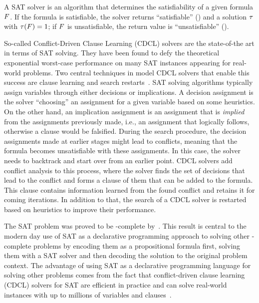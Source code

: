 A SAT solver is an algorithm that determines the satisfiability of a given formula $F$.
If the formula is satisfiable, the solver returns ``satisfiable'' (\sat{}) and a solution $\tau$ with $\tau(F)=1$;
if $F$ is unsatisfiable, the return value is ``unsatisfiable'' (\unsat{}).

So-called Conflict-Driven Clause Learning (CDCL) solvers are the state-of-the art in terms of SAT solving.
They have been found to defy the theoretical exponential worst-case performance on many SAT instances appearing for real-world problems.
Two central techniques in model CDCL solvers that enable this success are clause learning and search restarts~\autocite{handbook2-cdcl}.
SAT solving algorithms typically assign variables through either decisions or implications.
A decision assignment is the solver ``choosing'' an assignment for a given variable based on some heuristics.
On the other hand, an implication assignment is an assignment that is \emph{implied} from the assignments previously made, i.e., an assignment that logically follows, otherwise a clause would be falsified.
During the search procedure, the decision assignments made at earlier stages might lead to conflicts, meaning that the formula becomes unsatisfiable with these assignments.
In this case, the solver needs to backtrack and start over from an earlier point.
CDCL solvers add conflict analysis to this process, where the solver finds the set of decisions that lead to the conflict and forms a clause of them that can be added to the formula.
This clause contains information learned from the found conflict and retains it for coming iterations.
In addition to that, the search of a CDCL solver is restarted based on heuristics to improve their performance.

The SAT problem was proved to be \NP-complete by~\textcite{DBLP:conf/stoc/Cook71}.
This result is central to the modern day use of SAT as a declarative programming approach to solving other \NP-complete problems by encoding them as a propositional formula first, solving them with a SAT solver and then decoding the solution to the original problem context.
The advantage of using SAT as a declarative programming language for solving other problems comes from the fact that conflict-driven clause learning (CDCL) solvers for SAT are efficient in practice and can solve real-world instances with up to millions of variables and clauses~\autocite{handbook2-cdcl}.

